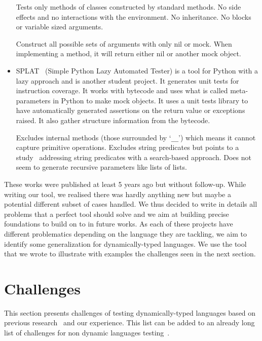 \documentclass{llncs2e/llncs}
\begin{document}
\begin{itemize}
    Tests only methods of classes constructed by standard methods. No side
    effects and no interactions with the environment. No inheritance. No blocks
    or variable sized arguments.

    Construct all possible sets of arguments with only nil or mock. When
    implementing a method, it will return either nil or another mock object.

  \item SPLAT~\cite{splat} (Simple Python Lazy Automated Tester) is a tool for
    Python with a lazy approach and is another student project. It generates
    unit tests for instruction coverage.  It works with bytecode and uses what
    is called meta-parameters in Python to make mock objects. It uses a unit
    tests library to have automatically generated assertions on the return value
    or exceptions raised. It also gather structure information from the
    bytecode.

    Excludes internal methods (those surrounded by `\texttt{\_\_}') which means
    it cannot capture primitive operations. Excludes string predicates but
    points to a study~\cite{alshraideh2006search} addressing string predicates
    with a search-based approach. Does not seem to generate recursive parameters
    like lists of lists.
\end{itemize}

These works were published at least 5 years ago but without follow-up. While
writing our tool, we realised there was hardly anything new but maybe a
potential different subset of cases handled. We thus decided to write in details
all problems that a perfect tool should solve and we aim at building precise
foundations to build on to in future works. As each of these projects have
different problematics depending on the language they are tackling, we aim to
identify some generalization for dynamically-typed languages. We use the tool
that we wrote to illustrate with examples the challenges seen in the next
section.


\section{Challenges}
\label{challenges}

This section presents challenges of testing dynamically-typed languages based on
previous research~\cite{ducasse2011challenges} and our experience. This list
can be added to an already long list of challenges for non dynamic languages
testing~\cite{mcminn2011search}.
\end{document}
